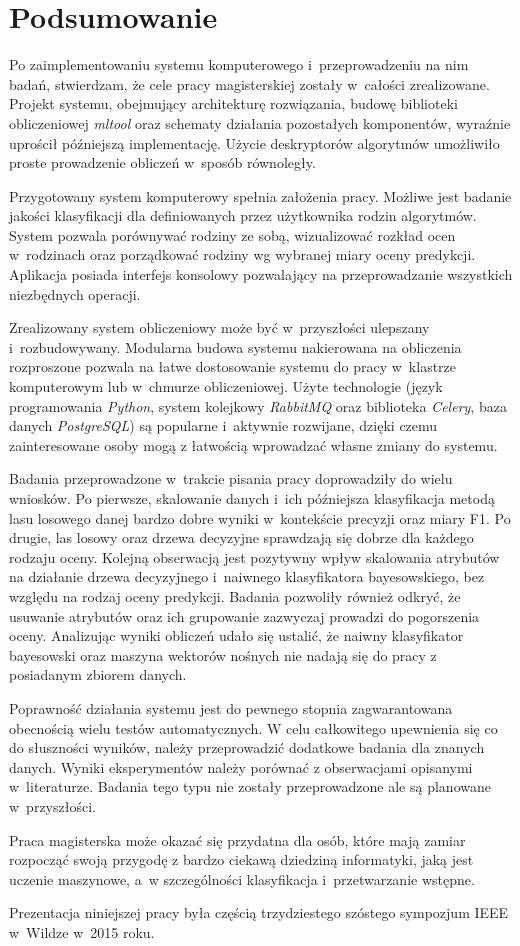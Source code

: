 \documentclass[../thesis.tex]{subfiles}
\begin{document}
\pagestyle{plain}
\chapter{Podsumowanie}

Po zaimplementowaniu systemu komputerowego i~przeprowadzeniu na nim badań, stwierdzam, że cele pracy magisterskiej zostały w~całości zrealizowane. Projekt systemu, obejmujący architekturę rozwiązania, budowę biblioteki obliczeniowej \emph{mltool} oraz schematy działania pozostałych komponentów, wyraźnie uprościł późniejszą implementację. Użycie deskryptorów algorytmów umożliwiło proste prowadzenie obliczeń w~sposób równoległy. 

Przygotowany system komputerowy spełnia założenia pracy. Możliwe jest badanie jakości klasyfikacji dla definiowanych przez użytkownika rodzin algorytmów. System pozwala porównywać rodziny ze sobą, wizualizować rozkład ocen w~rodzinach oraz porządkować rodziny wg wybranej miary oceny predykcji. Aplikacja posiada interfejs konsolowy pozwalający na przeprowadzanie wszystkich niezbędnych operacji.

Zrealizowany system obliczeniowy może być w~przyszłości ulepszany i~rozbudowywany. Modularna budowa systemu nakierowana na obliczenia rozproszone pozwala na łatwe dostosowanie systemu do pracy w~klastrze komputerowym lub w~chmurze obliczeniowej. Użyte technologie (język programowania \emph{Python}, system kolejkowy \emph{RabbitMQ} oraz biblioteka \emph{Celery}, baza danych \emph{PostgreSQL}) są popularne i~aktywnie rozwijane, dzięki czemu zainteresowane osoby mogą z łatwością wprowadzać własne zmiany do systemu.

Badania przeprowadzone w~trakcie pisania pracy doprowadziły do wielu wniosków. Po pierwsze, skalowanie danych i~ich późniejsza klasyfikacja metodą lasu losowego danej bardzo dobre wyniki w~kontekście precyzji oraz miary F1. Po drugie, las losowy oraz drzewa decyzyjne sprawdzają się dobrze dla każdego rodzaju oceny. Kolejną obserwacją jest pozytywny wpływ skalowania atrybutów na działanie drzewa decyzyjnego i~naiwnego klasyfikatora bayesowskiego, bez względu na rodzaj oceny predykcji. Badania pozwoliły również odkryć, że usuwanie atrybutów oraz ich grupowanie zazwyczaj prowadzi do pogorszenia oceny. Analizując wyniki obliczeń udało się ustalić, że naiwny klasyfikator bayesowski oraz maszyna wektorów nośnych nie nadają się do pracy z posiadanym zbiorem danych.

Poprawność działania systemu jest do pewnego stopnia zagwarantowana obecnością wielu testów automatycznych. W celu całkowitego upewnienia się co do słuszności wyników, należy przeprowadzić dodatkowe badania dla znanych danych. Wyniki eksperymentów należy porównać z obserwacjami opisanymi w~literaturze. Badania tego typu nie zostały przeprowadzone ale są planowane w~przyszłości.

Praca magisterska może okazać się przydatna dla osób, które mają zamiar rozpocząć swoją przygodę z bardzo ciekawą dziedziną informatyki, jaką jest uczenie maszynowe, a~w szczególności klasyfikacja i~przetwarzanie wstępne.

Prezentacja niniejszej pracy była częścią trzydziestego szóstego sympozjum IEEE w~Wildze w~2015 roku.
\end{document}
